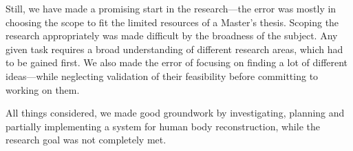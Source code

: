 Still, we have made a promising start in the research---the error was mostly in choosing the scope to fit the limited resources of a Master's thesis. Scoping the research appropriately was made difficult by the broadness of the subject. Any given task requires a broad understanding of different research areas, which had to be gained first. We also made the error of focusing on finding a lot of different ideas---while neglecting validation of their feasibility before committing to working on them.

All things considered, we made good groundwork by investigating, planning and partially implementing a system for human body reconstruction, while the research goal was not completely met.
